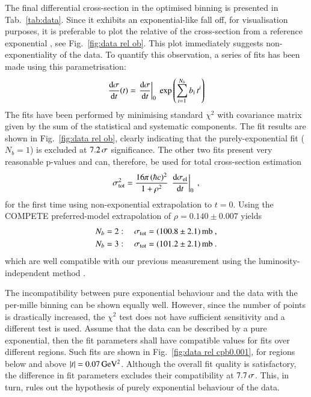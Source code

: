 The final differential cross-section in the optimised binning is presented in Tab.~\ref{tab:data}. Since it exhibits an exponential-like fall off, for visualisation purposes, it is preferable to plot the relative of the cross-section from a reference exponential%
, see Fig.~\ref{fig:data rel ob}. This plot immediately suggests non-exponentiality of the data. To quantify this observation, a series of fits has been made using this parametrisation:
\begin{equation}
\label{fit param}
{{\rm d}\sigma\over{\rm d}t}(t) = \left. {\rm d}\sigma\over{\rm d} t\right|_{0} \ \exp\left( \sum\limits_{i = 1}^{N_{b}} b_i\, t^i \right)
\end{equation}
The fits have been performed by minimising standard $\chi^2$ with covariance matrix given by the sum of the statistical and systematic components. The fit results are shown in Fig.~\ref{fig:data rel ob}, clearly indicating that the purely-exponential fit ($N_b = 1$) is excluded at $7.2\,{\rm \sigma}$ significance. The other two fits present very reasonable p-values and can, therefore, be used for total cross-section estimation
\begin{equation}
\label{eq:si tot}
\sigma_{\rm tot}^2 = {16\pi\, (\hbar c)^2\over 1 + \rho^2}\, \left. {\rm d}\sigma_{\rm el}\over{\rm d} t\right|_0\ ,
\end{equation}
for the first time using non-exponential extrapolation to $t=0$. Using the COMPETE \cite{compete} preferred-model extrapolation of $\rho = 0.140\pm 0.007$ yields
\begin{equation}
\label{eq:si tot results}
	\begin{aligned}
		N_b &= 2:\quad \sigma_{\rm tot} = (100.8 \pm 2.1)\un{mb}\ ,\\	%
		N_b &= 3:\quad \sigma_{\rm tot} = (101.2 \pm 2.1)\un{mb}\ .\\	%
	\end{aligned}
\end{equation}
which are well compatible with our previous measurement using the luminosity-independent method \cite{prl111}.



The incompatibility between pure exponential behaviour and the data with the per-mille binning can be shown equally well. However, since the number of points is drastically increased, the $\chi^2$ test does not have sufficient sensitivity and a different test is used. Assume that the data can be described by a pure exponential, then the fit parameters shall have compatible values for fits over different regions. Such fits are shown in Fig.~\ref{fig:data rel cpb0.001}, for regions below and above $|t| = 0.07\,{\rm GeV^2}$. Although the overall fit quality is satisfactory, the difference in fit parameters excludes their compatibility at $7.7\,{\rm \sigma}$. This, in turn, rules out the hypothesis of purely exponential behaviour of the data.


